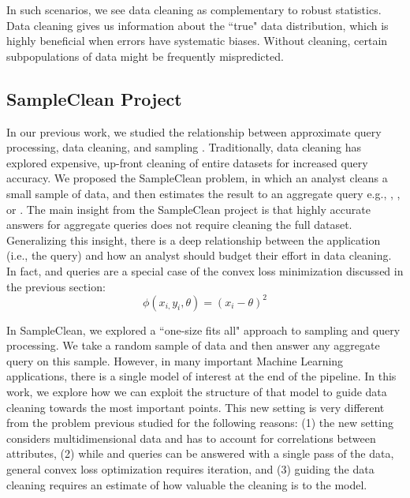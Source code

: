 In such scenarios, we see data cleaning as complementary to robust statistics.
Data cleaning gives us information about the ``true" data distribution, which is highly beneficial when errors have systematic biases.
Without cleaning, certain subpopulations of data might be frequently mispredicted. 

\subsection{SampleClean Project}
In our previous work, we studied the relationship between approximate query processing, data cleaning, and sampling \cite{wang1999sample, technicalReport}.
Traditionally, data cleaning has explored expensive, up-front cleaning of entire datasets for increased query accuracy.
We proposed the SampleClean problem, in which an analyst cleans a small sample of data, and then estimates the result to an aggregate query e.g., \sumfunc, \countfunc, or \avgfunc.
The main insight from the SampleClean project is that highly accurate answers for aggregate queries does not require cleaning the full dataset.
Generalizing this insight, there is a deep relationship between the application (i.e., the query) and how an analyst should budget their effort in data cleaning.
In fact, \avgfunc and \sumfunc queries are a special case of the convex loss minimization discussed in the previous section:
\[
\phi(x_{i,}y_{i},\theta) = (x_{i} - \theta)^2
\]

In SampleClean, we explored a ``one-size fits all" approach to sampling and query processing.
We take a random sample of data and then answer any aggregate query on this sample.
However, in many important Machine Learning applications, there is a single model of interest at the end of the pipeline.
In this work, we explore how we can exploit the structure of that model to guide data cleaning towards the most important points.
This new setting is very different from the problem previous studied for the following reasons: (1) the new setting considers multidimensional data and has to account for correlations between attributes, (2) while \avgfunc and \sumfunc queries can be answered with a single pass of the data, general convex loss optimization requires iteration, and (3) guiding the data cleaning requires an estimate of how valuable the cleaning is to the model.


